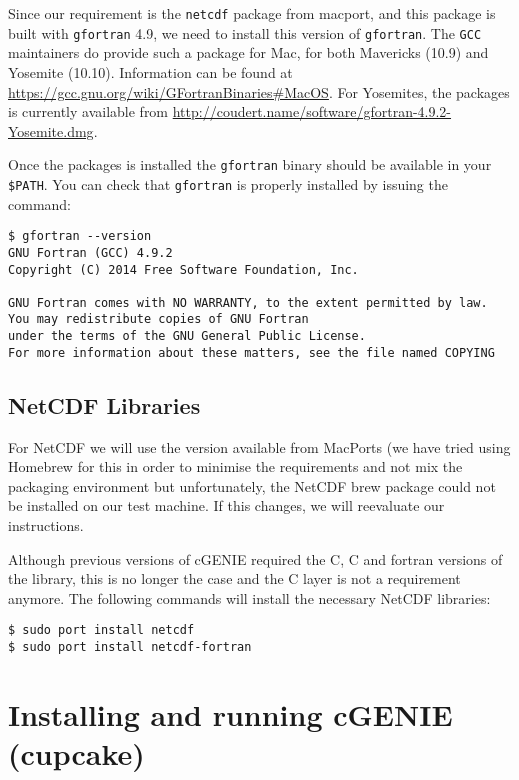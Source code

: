 \documentclass{scrartcl}
\DeclareRobustCommand\Cpp{\hbox{C\hspace{-.05em}\raisebox{.2ex}{\textbf{+\kern-.2ex+}}}}
\begin{document}
Since our requirement is the \texttt{netcdf} package from macport, and this
package is built with \texttt{gfortran} 4.9, we need to install this version of
\texttt{gfortran}. The \texttt{GCC} maintainers do provide such a package for
Mac, for both Mavericks (10.9) and Yosemite (10.10). Information can be found
at \url{https://gcc.gnu.org/wiki/GFortranBinaries#MacOS}. For Yosemites, the
packages is currently available from
\url{http://coudert.name/software/gfortran-4.9.2-Yosemite.dmg}. 

Once the packages is installed the \texttt{gfortran} binary should be available
in your \verb|$PATH|. You can check that \texttt{gfortran} is properly
installed by issuing the command:

\begin{verbatim}
$ gfortran --version
GNU Fortran (GCC) 4.9.2
Copyright (C) 2014 Free Software Foundation, Inc.

GNU Fortran comes with NO WARRANTY, to the extent permitted by law.
You may redistribute copies of GNU Fortran
under the terms of the GNU General Public License.
For more information about these matters, see the file named COPYING
\end{verbatim} 

\subsection{NetCDF Libraries}

For NetCDF we will use the version available from MacPorts (we have tried using
Homebrew for this in order to minimise the requirements and not mix the
packaging environment but unfortunately, the NetCDF brew package could not be
installed on our test machine. If this changes, we will reevaluate our
instructions.

Although previous versions of cGENIE required the C, \Cpp{} and fortran versions
of the library, this is no longer the case and the \Cpp{} layer is not a
requirement anymore. The following commands  will install the necessary NetCDF
libraries:

\begin{verbatim}
$ sudo port install netcdf
$ sudo port install netcdf-fortran
\end{verbatim}

\section{Installing and running cGENIE (cupcake)}
\end{document}
